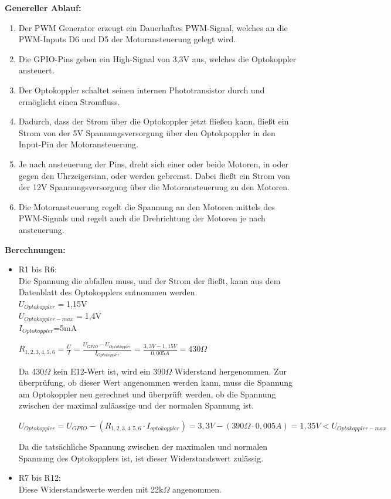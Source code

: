 \textbf{Genereller Ablauf:}
\begin{enumerate}
\item Der PWM Generator erzeugt ein Dauerhaftes PWM-Signal, welches an die PWM-Inputs D6 und D5 der Motoransteuerung gelegt wird.
\item Die GPIO-Pins geben ein High-Signal von 3,3V aus, welches die Optokoppler ansteuert. 
\item Der Optokoppler schaltet seinen internen Phototransistor durch und ermöglicht einen Stromfluss.
\item Dadurch, dass der Strom über die Optokoppler jetzt fließen kann, fließt ein Strom von der 5V Spannungsversorgung über den Optokpoppler in den Input-Pin der Motoransteuerung.
\item Je nach ansteuerung der Pins, dreht sich einer oder beide Motoren, in oder gegen den Uhrzeigersinn, oder werden gebremst. Dabei fließt ein Strom von der 12V Spannungsversorgung über die Motoransteuerung zu den Motoren.
\item Die Motoransteuerung regelt die Spannung an den Motoren mittels des PWM-Signals und regelt auch die Drehrichtung der Motoren je nach ansteuerung.
\end{enumerate}
\textbf{Berechnungen:}
\begin{itemize}
\item R1 bis R6: \\
Die Spannung die abfallen muss, und der Strom der fließt, kann aus dem Datenblatt des Optokopplers entnommen werden.\\
$U_{Optokoppler}=$1,15V \\
$U_{Optokoppler-max}=$1,4V \\
$I_{Optokoppler}$=5mA \\

\begin{center}
$R_{1,2,3,4,5,6}=\frac{U}{I}=\frac{U_{GPIO}-U_{Optokoppler}}{I_{Optokoppler}}=\frac{3,3V-1,15V}{0,005A}=430\Omega$
\end{center}
Da 430$\Omega$ kein E12-Wert ist, wird ein 390$\Omega$ Widerstand hergenommen.
Zur überprüfung, ob dieser Wert angenommen werden kann, muss die Spannung am Optokoppler neu gerechnet und überprüft werden, ob die Spannung zwischen der maximal zuläassige und der normalen Spannung ist.
\begin{center}
$U_{Optokoppler}=U_{GPIO}-(R_{1,2,3,4,5,6} \cdot I_{optokoppler})=3,3V-(390\Omega \cdot 0,005A) = 1,35V < U_{Optokoppler-max}$
\end{center}
Da die tatsächliche Spannung zwischen der maximalen und normalen Spannung des Optokopplers ist, ist dieser Widerstandswert zulässig.\\
\item R7 bis R12:\\
Diese Widerstandswerte werden mit 22k$\Omega$ angenommen.
\end{itemize}

